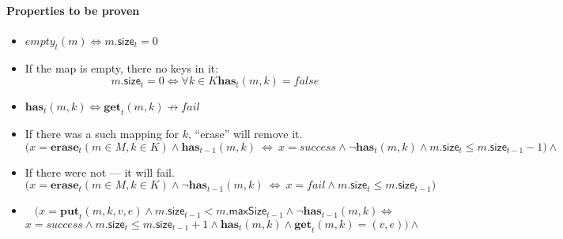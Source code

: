 \documentclass{article}
\renewcommand{\o}[1]{\ensuremath{\mathbf{#1}}}
\newcommand{\p}[1]{\ensuremath{\mathit{#1}}}
\newcommand{\s}[1]{\ensuremath{\mathsf{#1}}}
\newcommand{\nintset}{\ensuremath{\mathds{Z}_{\ge 0}}}
\begin{document}
\paragraph{Properties to be proven}
\begin{itemize}
  \item $\p{empty}_t(m) \Leftrightarrow m.\s{size}_t=0$
  \item If the map is empty, there no keys in it:
    $$m.\s{size}_t=0 \Leftrightarrow \forall k\in K \o{has}_t(m, k) = false $$
  \item $\o{has}_t(m, k) \Leftrightarrow \o{get}_t(m, k) \not\rightarrow fail$

      \item If there was a such mapping for $k$, ``erase'' will remove it.
        $$\Big(x=\o{erase}_t(m\in M, k\in K) \wedge \o{has}_{t-1}(m, k) ~\Leftrightarrow~ x=success \wedge \neg\o{has}_t(m, k) \wedge m.\s{size}_t \le m.\s{size}_{t-1}-1 \Big) \wedge$$
      \item If there were not --- it will fail. 
        $$\Big(x=\o{erase}_t(m\in M, k\in K) \wedge \neg\o{has}_{t-1}(m, k) ~\Leftrightarrow~ x=fail\wedge m.\s{size}_t \le m.\s{size}_{t-1}\Big)$$

      \item 
          $$\Big(x=\o{put}_t(m, k, v, e) \wedge m.\s{size}_{t-1} < m.\s{maxSize}_{t-1} \wedge \neg\o{has}_{t-1}(m, k) \Leftrightarrow $$
          $$ x=success \wedge m.\s{size}_t \le m.\s{size}_{t-1}+1 \wedge \o{has}_t(m, k)\wedge\o{get}_t(m, k) = (v, e)\Big)\wedge$$





\end{itemize}
\end{document}

